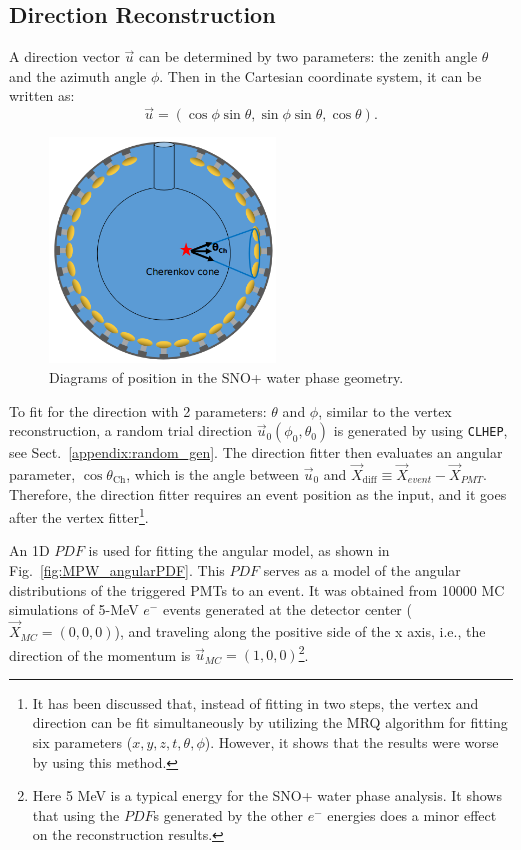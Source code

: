 \subsection{Direction Reconstruction}\label{sect:waterDirection}
A direction vector $\vec{u}$ can be determined by two parameters: the zenith angle $\theta$ and the azimuth angle $\phi$. Then in the Cartesian coordinate system, it can be written as: 
\begin{equation}
\vec{u}=(\cos\phi\sin\theta,\sin\phi\sin\theta,\cos\theta).
\end{equation}

\begin{figure}[htbp]
	\centering
	\includegraphics[width=6cm]{mpwDiagram2.png}
	\caption{Diagrams of position in the SNO+ water phase geometry.}
	\label{mpwdiagram_direction}
\end{figure}
To fit for the direction with 2 parameters: $\theta$ and $\phi$, similar to the vertex reconstruction, a random trial direction $\vec{u}_0(\phi_0,\theta_0)$ is generated by using \texttt{CLHEP}, see Sect.~\ref{appendix:random_gen}. The direction fitter then evaluates an angular parameter, $\cos\theta_{\mathrm{Ch}}$, which is the angle between $\vec{u}_{0}$ and $\vec{X}_{{\mathrm{diff}}}\equiv \vec{X}_{event}-\vec{X}_{PMT}$. Therefore, the direction fitter requires an event position as the input, and it goes after the vertex fitter\footnote{It has been discussed that, instead of fitting in two steps, the vertex and direction can be fit simultaneously by utilizing the MRQ algorithm for fitting six parameters ($x,y,z,t,\theta,\phi$). However, it shows that the results were worse by using this method.}.

An 1D $PDF$ is used for fitting the angular model, as shown in Fig.~\ref{fig:MPW_angularPDF}. This $PDF$ serves as a model of the angular distributions of the triggered PMTs to an event. It was obtained from 10000 MC simulations of 5-MeV $e^-$ events generated at the detector center ($\vec{X}_{MC}=(0,0,0)$), and traveling along the positive side of the x axis, i.e., the direction of the momentum is $\vec{u}_{MC}=(1,0,0)$\footnote{Here 5 MeV is a typical energy for the SNO+ water phase analysis. It shows that using the $PDF$s generated by the other $e^-$ energies does a minor effect on the reconstruction results.}.

